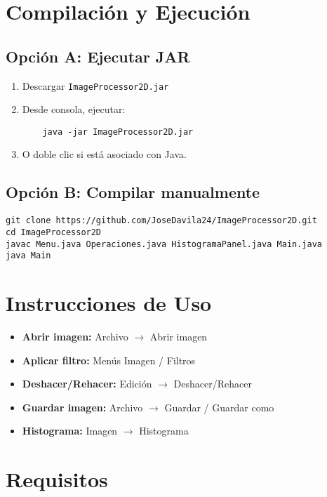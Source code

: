 \documentclass[12pt]{article}
\begin{document}
\section{Compilación y Ejecución}

\subsection*{Opción A: Ejecutar JAR}
\begin{enumerate}
    \item Descargar \texttt{ImageProcessor2D.jar}
    \item Desde consola, ejecutar:
    \begin{verbatim}
    java -jar ImageProcessor2D.jar
    \end{verbatim}
    \item O doble clic si está asociado con Java.
\end{enumerate}

\subsection*{Opción B: Compilar manualmente}
\begin{verbatim}
git clone https://github.com/JoseDavila24/ImageProcessor2D.git
cd ImageProcessor2D
javac Menu.java Operaciones.java HistogramaPanel.java Main.java
java Main
\end{verbatim}

\section{Instrucciones de Uso}

\begin{itemize}
    \item \textbf{Abrir imagen:} Archivo $\rightarrow$ Abrir imagen
    \item \textbf{Aplicar filtro:} Menús Imagen / Filtros
    \item \textbf{Deshacer/Rehacer:} Edición $\rightarrow$ Deshacer/Rehacer
    \item \textbf{Guardar imagen:} Archivo $\rightarrow$ Guardar / Guardar como
    \item \textbf{Histograma:} Imagen $\rightarrow$ Histograma
\end{itemize}

\section{Requisitos}
\end{document}
